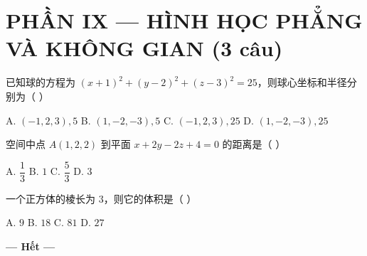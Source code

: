 \documentclass[11pt, a4paper]{article}
\begin{document}
\section{PHẦN IX — HÌNH HỌC PHẲNG VÀ KHÔNG GIAN (3 câu)}

\begin{baitap}[46]
已知球的方程为 $(x + 1)^2 + (y - 2)^2 + (z - 3)^2 = 25$，则球心坐标和半径分别为（ ）
\par\vspace{3pt}
\noindent A. $(-1, 2, 3), 5$ \quad B. $(1, -2, -3), 5$ \quad C. $(-1, 2, 3), 25$ \quad D. $(1, -2, -3), 25$
\end{baitap}

\begin{baitap}[47]
空间中点 $A(1, 2, 2)$ 到平面 $x + 2y - 2z + 4 = 0$ 的距离是（ ）
\par\vspace{3pt}
\noindent A. $\dfrac{1}{3}$ \quad B. $1$ \quad C. $\dfrac{5}{3}$ \quad D. $3$
\end{baitap}

\begin{baitap}[48]
一个正方体的棱长为 $3$，则它的体积是（ ）
\par\vspace{3pt}
\noindent A. $9$ \quad B. $18$ \quad C. $81$ \quad D. $27$
\end{baitap}

\vspace{0.5cm}
\begin{center}
\textbf{--- Hết ---}
\end{center}
\end{document}
